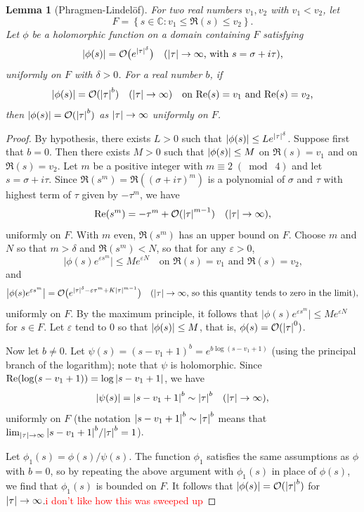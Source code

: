 \documentclass[10pt,leqno,twoside]{article}
\theoremstyle{plain}
\newtheorem{lemma}[lem]{Lemma}
\theoremstyle{definition}
\numberwithin{equation}{section}
\numberwithin{lem}{section}
\newcommand{\cbr}[1]{\left\{#1\right\}}
\newcommand{\smod}[1]{\;(\bmod\; #1)}
\newcommand{\sai}[1]{\textcolor{red}{#1}}
\begin{document}
\begin{lemma}[Phragmen-Lindel\"of]\label{lem: miyake lem 4.3.4}
    For two real numbers $v_1,v_2$ with $v_1<v_2$, let 
    \[F = \cbr{s\in \mathbb C : v_1\leq \Re(s)\leq v_2}.\] Let $\phi$ be a holomorphic function on a domain containing $F$ satisfying \[\abs{\phi(s)} = \mathcal O\big(e^{\abs{\tau}^\delta}\big)\quad \textup{($\abs{\tau}\to\infty$, with $s = \sigma + i\tau$),}\]
    uniformly on $F$ with $\delta >0$. For a real number $b$, if 
    \[\abs{\phi(s)} = \mathcal O(\abs{\tau}^b)\quad (\abs{\tau}\to\infty) \quad \text{on $\Re(s) = v_1$ and $\Re(s) = v_2$,}\]
    then $\abs{\phi(s)} = \mathcal O(\abs{\tau}^b)$ as $\abs{\tau}\to\infty$ uniformly on $F$.
\end{lemma}
\begin{proof}
    By hypothesis, there exists $L>0$ such that $\abs{\phi(s)}\leq Le^{\abs{\tau}^\delta}$. Suppose first that $b = 0$. Then there exists $M>0$ such that $\abs{\phi(s)}\leq M$ on $\Re(s) = v_1$ and on $\Re(s) = v_2$. Let $m$ be a positive integer with $m\equiv 2\smod 4$ and let $s = \sigma + i \tau$. Since $\Re(s^m) = \Re((\sigma  + i\tau)^m)$ is a polynomial of $\sigma$ and $\tau$ with highest term of $\tau$ given by $-\tau^m$, we have 
    \[\Re(s^m) = -\tau^m + \mathcal O(\abs{\tau}^{m-1})\quad (\abs{\tau}\to\infty),\] uniformly on $F$. With $m$ even, $\Re(s^m)$ has an upper bound on $F$. Choose $m$ and $N$ so that $m>\delta$ and $\Re(s^m)<N$, so that for any $\varepsilon>0$,
    \[\big|\phi(s)e^{\varepsilon s^m}\big|\leq Me^{\varepsilon N}\quad \text{on $\Re(s) = v_1$ and $\Re(s) = v_2$,}\]
    and
    \[\big|\phi(s)e^{\varepsilon s^m}\big| = \mathcal O\big(e^{\abs{\tau}^\delta -\varepsilon\tau^m + K\abs{\tau}^{m-1}}\big)\quad (\abs{\tau}\to\infty\text{, so this quantity tends to zero in the limit}),\] uniformly on $F$. By the maximum principle, it follows that $\big|\phi(s)e^{\varepsilon s^m}\big|\leq Me^{\varepsilon N}$ for $s\in F$. Let $\varepsilon$ tend to $0$ so that $\abs{\phi(s)}\leq M$, that is, $\phi(s) = \mathcal O(\abs{\tau}^0)$.

    Now let $b\neq 0$. Let $\psi(s) = (s-v_1+1)^b = e^{b\log(s-v_1+1)}$ (using the principal branch of the logarithm); note that $\psi$ is holomorphic. Since $\Re(\log(s-v_1+1)) = \log\abs{s-v_1+1}$, we have 
    \[\abs{\psi(s)} = \abs{s-v_1+1}^b\sim \abs{\tau}^b\quad (\abs{\tau}\to\infty),\] uniformly on $F$ (the notation $\abs{s-v_1+1}^b\sim \abs{\tau}^b$ means that $\lim_{\abs{\tau}\to\infty} \abs{s-v_1+1}^b/\abs{\tau}^b = 1$).

    Let $\phi_1(s) = \phi(s)/\psi(s)$. The function $\phi_1$ satisfies the same assumptions as $\phi$ with $b = 0$, so by repeating the above argument with $\phi_1(s)$ in place of $\phi(s)$, we find that $\phi_1(s)$ is bounded on $F$. It follows that $\abs{\phi(s)} = \mathcal O(\abs{\tau}^b)$ for $\abs{\tau}\to\infty$.\sai{i don't like how this was sweeped up}
\end{proof}
\end{document}
